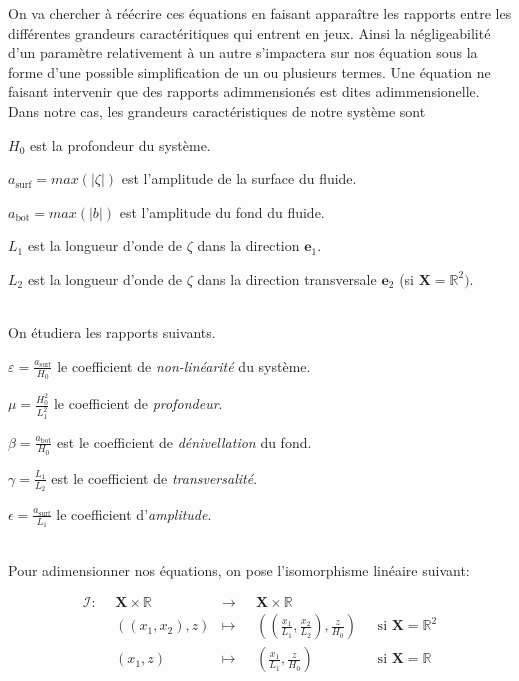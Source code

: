 \documentclass[12pt,a4paper]{article}
\numberwithin{equation}{section}
\begin{document}
On va chercher à réécrire ces équations en faisant apparaître les rapports entre les différentes grandeurs caractéritiques qui entrent en jeux. Ainsi la négligeabilité d'un paramètre relativement à un autre s'impactera sur nos équation sous la forme d'une possible simplification de un ou plusieurs termes. Une équation ne faisant intervenir que des rapports adimmensionés est dites adimmensionelle. 
\\

Dans notre cas, les grandeurs caractéristiques de notre système sont

\begin{list}{\textbullet}{}
    \item $H_0$ est la profondeur du système.
    \item $a_{\text{surf}} = max(|\zeta|)$ est l'amplitude de la surface du fluide.
    \item $a_{\text{bot}} = max(|b|)$ est l'amplitude du fond du fluide.
    \item $L_1$ est la longueur d'onde de $\zeta$ dans la direction $\textbf{e}_1$.
    \item $L_2$ est la longueur d'onde de $\zeta$ dans la direction transversale $\textbf{e}_2$ (si $\textbf{X} = \mathbb{R}^2)$.
\end{list}
\,
\\

On étudiera les rapports suivants.

\begin{list}{\textbullet}{}
    \item $\varepsilon = \frac{a_{\text{surf}}}{H_0}$ le coefficient de \textit{non-linéarité} du système.
    \item $\mu =\frac{H_0^2}{L_1^2}$ le coefficient de \textit{profondeur}.
    \item $\beta = \frac{a_{\text{bot}}}{H_0}$ est le coefficient de \textit{dénivellation} du fond.
    \item $\gamma = \frac{L_1}{L_2}$ est le coefficient de \textit{transversalité}.
    \item $\epsilon = \frac{ a_{\text{surf}}}{L_1}$ le coefficient d'\textit{amplitude}.
\end{list}

~\\
Pour adimensionner nos équations, on pose l'isomorphisme linéaire suivant:

  
\begin{equation}
\begin{aligned}
      \mathcal{I}:~~&\textbf{X}\times\mathbb{R} &\longrightarrow ~~~ &\textbf{X}\times \mathbb{R} & \\
      &((x_1,x_2),z) &\longmapsto &\left(\left(\frac{x_1}{L_1},\frac{x_2}{L_2} \right),\frac{z}{H_0}\right) ~~~&\text{si }\textbf{X}=\mathbb{R}^2\\
      &(x_1 ,z) &\longmapsto &\left(\frac{x_1}{L_1},\frac{z}{H_0}\right) ~~~&\text{si }   \textbf{X}=\mathbb{R}
\end{aligned}
\end{equation}
\end{document}
